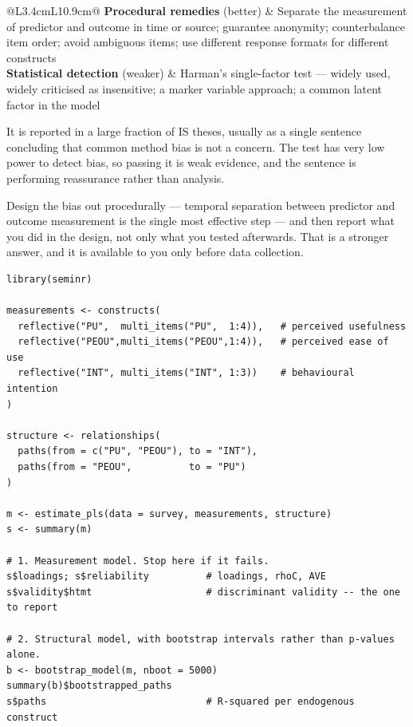 \begin{center}
\small
\begin{tabular}{@{}L{3.4cm}L{10.9cm}@{}}
\toprule
\textbf{Procedural remedies} (better) & Separate the measurement of predictor
                                        and outcome in time or source;
                                        guarantee anonymity; counterbalance
                                        item order; avoid ambiguous items;
                                        use different response formats for
                                        different constructs \\
\textbf{Statistical detection} (weaker) & Harman's single-factor test --- widely
                                        used, widely criticised as
                                        insensitive; a marker variable
                                        approach; a common latent factor in the
                                        model \\
\bottomrule
\end{tabular}
\end{center}

\begin{alertbox}
It is reported in a large fraction of IS theses, usually as a single sentence
concluding that common method bias is not a concern. The test has very low
power to detect bias, so passing it is weak evidence, and the sentence is
performing reassurance rather than analysis.

\medskip
Design the bias out procedurally --- temporal separation between predictor and
outcome measurement is the single most effective step --- and then report what
you did in the design, not only what you tested afterwards. That is a stronger
answer, and it is available to you only before data collection.
\end{alertbox}

\begin{lstlisting}[language=Rlang, caption={A PLS-SEM assessment in the order that
matters: measurement model first, structural model only if it passes.}]
library(seminr)

measurements <- constructs(
  reflective("PU",  multi_items("PU",  1:4)),   # perceived usefulness
  reflective("PEOU",multi_items("PEOU",1:4)),   # perceived ease of use
  reflective("INT", multi_items("INT", 1:3))    # behavioural intention
)

structure <- relationships(
  paths(from = c("PU", "PEOU"), to = "INT"),
  paths(from = "PEOU",          to = "PU")
)

m <- estimate_pls(data = survey, measurements, structure)
s <- summary(m)

# 1. Measurement model. Stop here if it fails.
s$loadings; s$reliability          # loadings, rhoC, AVE
s$validity$htmt                    # discriminant validity -- the one to report

# 2. Structural model, with bootstrap intervals rather than p-values alone.
b <- bootstrap_model(m, nboot = 5000)
summary(b)$bootstrapped_paths
s$paths                            # R-squared per endogenous construct
\end{lstlisting}

